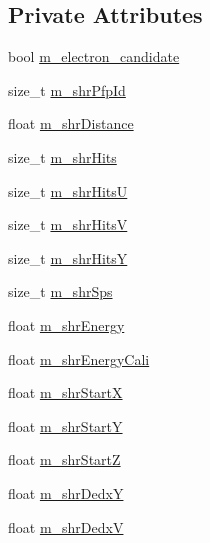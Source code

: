 \subsection*{Private Attributes}
\begin{DoxyCompactItemize}
\item 
bool \hyperlink{classselection_1_1CCincSelection_a61b7a5e571eac85c8171a3dbd6ab57c6}{m\+\_\+electron\+\_\+candidate}
\item 
size\+\_\+t \hyperlink{classselection_1_1CCincSelection_ad792c1259135d226df875d1150776ce9}{m\+\_\+shr\+Pfp\+Id}
\item 
float \hyperlink{classselection_1_1CCincSelection_ae496cb17c72b3ed96b13484a1ff9e3fb}{m\+\_\+shr\+Distance}
\item 
size\+\_\+t \hyperlink{classselection_1_1CCincSelection_ade863b5fa6560fed9dada486fa3469d6}{m\+\_\+shr\+Hits}
\item 
size\+\_\+t \hyperlink{classselection_1_1CCincSelection_a48423013d7f54f8b67c194534507f643}{m\+\_\+shr\+HitsU}
\item 
size\+\_\+t \hyperlink{classselection_1_1CCincSelection_a41998992412570fd00dc4e2457525b58}{m\+\_\+shr\+HitsV}
\item 
size\+\_\+t \hyperlink{classselection_1_1CCincSelection_aebe42543b0965cce015eb2a8412c33d4}{m\+\_\+shr\+HitsY}
\item 
size\+\_\+t \hyperlink{classselection_1_1CCincSelection_a4694bec595cce8e01abc186d9c34e079}{m\+\_\+shr\+Sps}
\item 
float \hyperlink{classselection_1_1CCincSelection_a2650ff351a7a6589c2b6ff9f701da321}{m\+\_\+shr\+Energy}
\item 
float \hyperlink{classselection_1_1CCincSelection_adec1b19741776f6e33a88b4d0f2b6330}{m\+\_\+shr\+Energy\+Cali}
\item 
float \hyperlink{classselection_1_1CCincSelection_a692099d6cabdf30bfd269f35c3193971}{m\+\_\+shr\+StartX}
\item 
float \hyperlink{classselection_1_1CCincSelection_a60b711d11ef5b1ce99992df868e900c7}{m\+\_\+shr\+StartY}
\item 
float \hyperlink{classselection_1_1CCincSelection_ac97b3d4c8f1dff8f692de9fc2c9f585c}{m\+\_\+shr\+StartZ}
\item 
float \hyperlink{classselection_1_1CCincSelection_aca70f9a6dfad2d0ed4c2ef4c71fe37bd}{m\+\_\+shr\+DedxY}
\item 
float \hyperlink{classselection_1_1CCincSelection_a2d1f501922cf14e3d1f6fb8cc8e63173}{m\+\_\+shr\+DedxV}
\item 

\end{DoxyCompactItemize}
